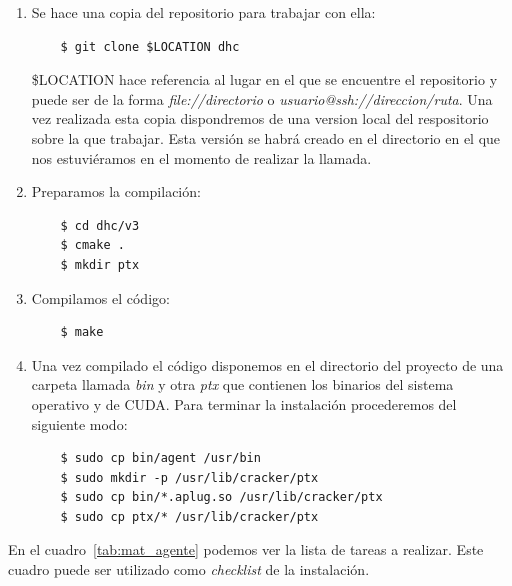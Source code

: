 \begin{enumerate}
	\item Se hace una copia del repositorio para trabajar con ella:
	
	\begin{verbatim}
	$ git clone $LOCATION dhc
	\end{verbatim}
	
	\$LOCATION hace referencia al lugar en el que se encuentre el repositorio y puede ser de la forma \emph{file://directorio} o \emph{usuario@ssh://direccion/ruta}. Una vez realizada esta copia dispondremos de una version local del respositorio sobre la que trabajar. Esta versión se habrá creado en el directorio en el que nos estuviéramos en el momento de realizar la llamada.
	
	\item Preparamos la compilación:
	
	\begin{verbatim}
	$ cd dhc/v3
	$ cmake .
	$ mkdir ptx
	\end{verbatim}
	
	\item Compilamos el código:
	
	\begin{verbatim}
	$ make
	\end{verbatim}
	
	\item Una vez compilado el código disponemos en el directorio del proyecto de una carpeta llamada \emph{bin} y otra \emph{ptx} que contienen los binarios del sistema operativo y de CUDA. Para terminar la instalación procederemos del siguiente modo:
	
	\begin{verbatim}
	$ sudo cp bin/agent /usr/bin
	$ sudo mkdir -p /usr/lib/cracker/ptx
	$ sudo cp bin/*.aplug.so /usr/lib/cracker/ptx
	$ sudo cp ptx/* /usr/lib/cracker/ptx
	\end{verbatim}
\end{enumerate}

En el cuadro~\ref{tab:mat_agente} podemos ver la lista de tareas a realizar. Este cuadro puede ser utilizado como \emph{checklist} de la instalación.


